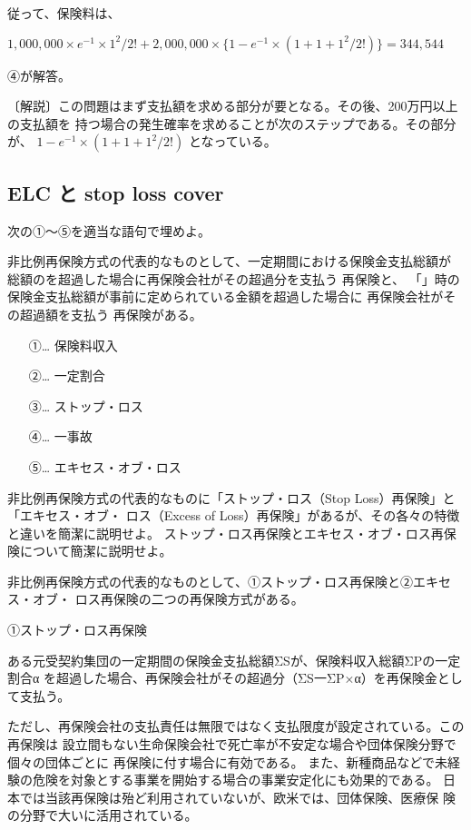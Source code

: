 \documentclass[report,gutter=10mm,fore-edge=10mm,uplatex,dvipdfmx]{jlreq}
\begin{document}
従って、保険料は、

$1,000,000\times e^{-1} \times 1^2/2! + 2,000,000\times \{1-e^{-1}\times(1+1+1^2/2!)\} =344,544$

④が解答。

〔解説〕この問題はまず支払額を求める部分が要となる。その後、200万円以上の支払額を
持つ場合の発生確率を求めることが次のステップである。その部分が、
$1−e^{-1}\times(1+1+1^2/2!)$ 
となっている。

\subsection{ELC と stop loss cover}

次の①～⑤を適当な語句で埋めよ。

非比例再保険方式の代表的なものとして、一定期間における保険金支払総額が
総額のを超過した場合に再保険会社がその超過分を支払う
再保険と、
「」時の保険金支払総額が事前に定められている金額を超過した場合に
再保険会社がその超過額を支払う
再保険がある。
\answer{}
\begin{itemize}
\item[ ①… ] 保険料収入
\item[ ②… ] 一定割合
\item[ ③… ] ストップ・ロス
\item[ ④… ] 一事故
\item[ ⑤… ] エキセス・オブ・ロス
\end{itemize}

非比例再保険方式の代表的なものに「ストップ・ロス（Stop Loss）再保険」と「エキセス・オブ・
ロス（Excess of Loss）再保険」があるが、その各々の特徴と違いを簡潔に説明せよ。
ストップ・ロス再保険とエキセス・オブ・ロス再保険について簡潔に説明せよ。

\answer{}
非比例再保険方式の代表的なものとして、①ストップ・ロス再保険と②エキセス・オブ・
ロス再保険の二つの再保険方式がある。

\noindent ①ストップ・ロス再保険

ある元受契約集団の一定期間の保険金支払総額ΣSが、保険料収入総額ΣPの一定割合α
を超過した場合、再保険会社がその超過分（ΣS一ΣP×α）を再保険金として支払う。

ただし、再保険会社の支払責任は無限ではなく支払限度が設定されている。この再保険は
設立間もない生命保険会社で死亡率が不安定な場合や団体保険分野で個々の団体ごとに
再保険に付す場合に有効である。
また、新種商品などで未経験の危険を対象とする事業を開始する場合の事業安定化にも効果的である。
日本では当該再保険は殆ど利用されていないが、欧米では、団体保険、医療保
険の分野で大いに活用されている。
\end{document}
